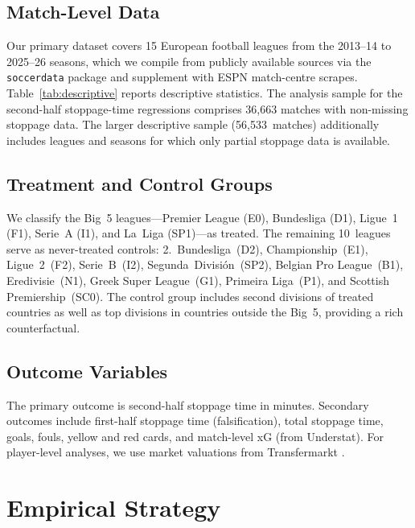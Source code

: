 \documentclass[12pt]{article}
\begin{document}
\subsection{Match-Level Data}

Our primary dataset covers 15 European football leagues from the
2013--14 to 2025--26 seasons, which we compile from publicly available
sources via the \texttt{soccerdata} package \citep{decroos2022soccerdata}
and supplement with ESPN match-centre scrapes. Table~\ref{tab:descriptive}
reports descriptive statistics. The analysis sample for the second-half
stoppage-time regressions comprises 36,663 matches with non-missing
stoppage data. The larger descriptive sample (56,533~matches)
additionally includes leagues and seasons for which only partial stoppage
data is available.

\subsection{Treatment and Control Groups}

We classify the Big~5 leagues---Premier League (E0), Bundesliga (D1),
Ligue~1 (F1), Serie~A (I1), and La~Liga (SP1)---as treated.
The remaining 10~leagues serve as never-treated controls:
2.~Bundesliga~(D2), Championship~(E1), Ligue~2~(F2), Serie~B~(I2),
Segunda~Divisi\'on~(SP2), Belgian Pro League~(B1), Eredivisie~(N1),
Greek Super League~(G1), Primeira Liga~(P1), and Scottish
Premiership~(SC0). The control group includes second divisions of
treated countries as well as top divisions in countries outside the
Big~5, providing a rich counterfactual.

\subsection{Outcome Variables}

The primary outcome is second-half stoppage time in minutes. Secondary
outcomes include first-half stoppage time (falsification), total
stoppage time, goals, fouls, yellow and red cards, and match-level
xG (from Understat). For player-level analyses, we use market
valuations from Transfermarkt \citep{herm2014market}.




\section{Empirical Strategy}\label{sec:strategy}
\end{document}
